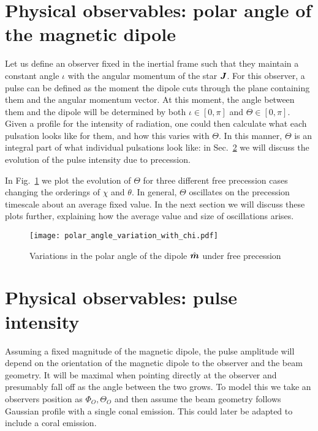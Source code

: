 \documentclass[../full_thesis/full_thesis.tex]{subfiles}
\begin{document}

\section{Physical observables: polar angle of the magnetic dipole}

Let us define an observer fixed in the inertial frame such that they
maintain a constant angle $\iota$ with the angular momentum of the star $\boldsymbol{J}$.
For this observer, a pulse can be defined as the moment the dipole cuts through
the plane containing them and the angular momentum vector. At this moment, the
angle between them and the dipole will be determined by both $\iota \in [0, \pi]$ and
$\Theta \in [0, \pi]$. Given a profile for the intensity of radiation, one could then
calculate what each pulsation looks like for them, and how this varies with
$\Theta$. In this manner, $\Theta$ is an integral part of what individual
pulsations look like: in Sec.~\ref{sec: intensity} we will discuss the evolution
of the pulse intensity due to precession.

In Fig.~\ref{fig: polar angle variations} we plot the evolution of $\Theta$ for
three different free precession cases changing the orderings of $\chi$ and
$\theta$. In general, $\Theta$ oscillates on the precession timescale about an
average fixed value. In the next section we will discuss these plots further,
explaining how the average value and size of oscillations arises.
\begin{figure}[ht]
\centering
  \texttt{[image: polar\_angle\_variation\_with\_chi.pdf]}
\caption{Variations in the polar angle of the dipole $\hat{\boldsymbol{m}}$ under free precession}
\label{fig: polar angle variations}
\end{figure}


\section{Physical observables: pulse intensity}
\label{sec: intensity}
Assuming a fixed magnitude of the magnetic dipole, the pulse amplitude will
depend on the orientation of the magnetic dipole to the observer and the
beam geometry. It will be
maximal when pointing directly at the observer and presumably fall off as the
angle between the two grows. To model this we take an observers position as
$\Phi_{O}, \Theta_{O}$ and then assume the beam geometry follows
Gaussian profile with a single conal emission. This could later be adapted
to include a coral emission.
\end{document}
